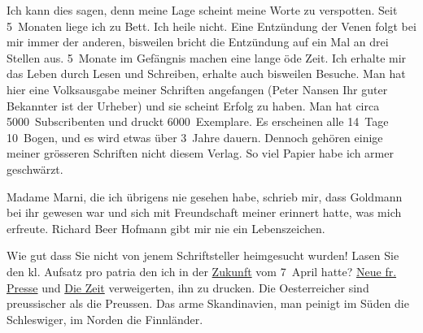 \pstart
           Ich kann dies sagen, denn meine Lage scheint meine Worte zu verspotten. Seit
               5 Monaten liege ich zu Bett. Ich heile nicht. Eine Entzündung der Venen folgt bei mir
               immer der anderen, bisweilen bricht die Entzündung auf ein Mal an drei Stellen aus.
               5 Monate im Gefängnis machen eine lange öde Zeit. Ich erhalte mir das Leben {\pb}durch Lesen und Schreiben, erhalte
               auch bisweilen Besuche. Man hat hier eine Volksausgabe meiner Schriften angefangen (Peter Nansen Ihr guter Bekannter ist der
               Urheber) und sie scheint Erfolg zu haben. Man hat circa 5000 Subscribenten und druckt
               6000 Exemplare. Es erscheinen alle 14 Tage 10 Bogen, und es wird etwas über 3 Jahre
               dauern. Dennoch gehören einige meiner grösseren Schriften nicht diesem Verlag. So
               viel Papier habe ich armer geschwärzt.\pend
           
\pstart
           Madame Marni, die ich übrigens nie gesehen
               habe, schrieb mir, dass Goldmann bei ihr
               gewesen war und sich mit Freundschaft meiner erinnert hatte, was mich erfreute. Richard Beer Hofmann gibt mir nie {\pb}ein Lebenszeichen.\pend
           
\pstart
           Wie gut dass Sie nicht von jenem Schriftsteller heimgesucht wurden! Lasen Sie den kl.
                  Aufsatz pro patria den ich
               in der \uline{Zukunft} vom 7 April hatte? \uline{Neue fr. Presse} und \uline{Die Zeit} verweigerten, ihn zu drucken. Die Oesterreicher sind preussischer als die
                  Preussen. Das arme Skandinavien, man peinigt im Süden die Schleswiger, im Norden die Finnländer.\pend
           

